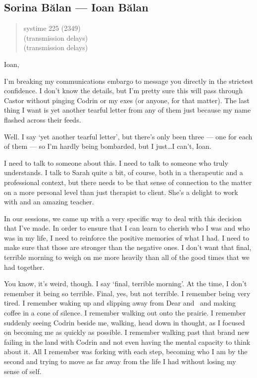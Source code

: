 \hypertarget{sorina-bux103lan-ioan-bux103lan}{%
\subsection{Sorina Bălan — Ioan Bălan}\label{sorina-bux103lan-ioan-bux103lan}}

\begin{quote}
systime 225 (2349)\\
(transmission delays)\\
(transmission delays)
\end{quote}

Ioan,

I'm breaking my communications embargo to message you directly in the strictest confidence. I don't know the details, but I'm pretty sure this will pass through Castor without pinging Codrin or my exes (or anyone, for that matter). The last thing I want is yet another tearful letter from any of them just because my name flashed across their feeds.

Well. I say `yet another tearful letter', but there's only been three — one for each of them — so I'm hardly being bombarded, but I just\ldots I can't, Ioan.

I need to talk to someone about this. I need to talk to someone who truly understands. I talk to Sarah quite a bit, of course, both in a therapeutic and a professional context, but there needs to be that sense of connection to the matter on a more personal level than just therapist to client. She's a delight to work with and an amazing teacher.

In our sessions, we came up with a very specific way to deal with this decision that I've made. In order to ensure that I can learn to cherish who I was and who was in my life, I need to reinforce the positive memories of what I had. I need to make sure that those are stronger than the negative ones. I don't want that final, terrible morning to weigh on me more heavily than all of the good times that we had together.

You know, it's weird, though. I say `final, terrible morning'. At the time, I don't remember it being so terrible. Final, yes, but not terrible. I remember being very tired. I remember waking up and slipping away from Dear and \Partner \ and making coffee in a cone of silence. I remember walking out onto the prairie. I remember suddenly seeing Codrin beside me, walking, head down in thought, as I focused on becoming me as quickly as possible. I remember walking past that brand new failing in the land with Codrin and not even having the mental capacity to think about it. All I remember was forking with each step, becoming who I am by the second and trying to move as far away from the life I had without losing my sense of self.

